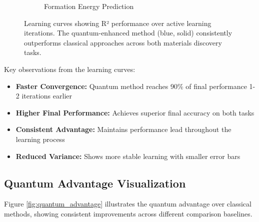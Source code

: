 \documentclass[twocolumn]{article}
\begin{document}
\begin{figure*}[t]
\begin{subfigure}[b]{0.48\textwidth}
\caption{Formation Energy Prediction}
\label{fig:learning_formation}
\end{subfigure}
\caption{Learning curves showing R² performance over active learning iterations. The quantum-enhanced method (blue, solid) consistently outperforms classical approaches across both materials discovery tasks.}
\label{fig:learning_curves}
\end{figure*}

Key observations from the learning curves:
\begin{itemize}
\item \textbf{Faster Convergence:} Quantum method reaches 90\% of final performance 1-2 iterations earlier
\item \textbf{Higher Final Performance:} Achieves superior final accuracy on both tasks
\item \textbf{Consistent Advantage:} Maintains performance lead throughout the learning process
\item \textbf{Reduced Variance:} Shows more stable learning with smaller error bars
\end{itemize}

\subsection{Quantum Advantage Visualization}

Figure \ref{fig:quantum_advantage} illustrates the quantum advantage over classical methods, showing consistent improvements across different comparison baselines.
\end{document}
